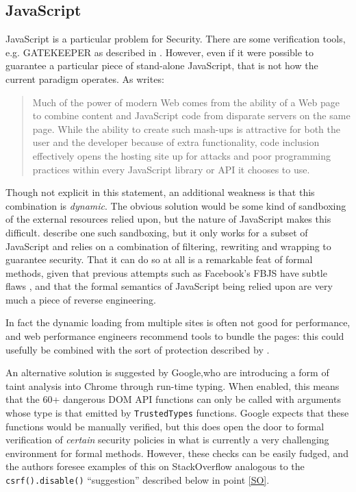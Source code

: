 \documentclass{llncs}
\begin{document}
\subsection{JavaScript}
JavaScript is a particular problem for Security. There are some verification tools, e.g. GATEKEEPER as described in \cite{GuarnieriLivshits2009}. However, even if it were possible to guarantee a particular piece of stand-alone JavaScript, that is not how the current paradigm operates. As \cite{MeyerovichLivshits2010a} writes:
\begin{quote}
Much of the power of modern Web comes from the
ability of a Web page to combine content and JavaScript code
from disparate servers on the same page. While the ability
to create such mash-ups is attractive for both the user and
the developer because of extra functionality, code inclusion
effectively opens the hosting site up for attacks and poor
programming practices within every JavaScript library or API
it chooses to use.
\end{quote}
Though not explicit in this statement, an additional weakness is that this combination is \emph{dynamic}.
The obvious solution would be some kind of sandboxing of the external resources relied upon, but the nature of JavaScript makes this difficult.  \cite{Maffeisetal2009} describe one such sandboxing, but it only works for a subset of JavaScript and relies on a combination of filtering, rewriting and wrapping to guarantee security. That it can do so at all is a remarkable feat of formal methods, given that previous attempts such as Facebook's FBJS have subtle flaws \cite{MaffeisTaly2009}, and that the formal semantics of JavaScript being relied upon are very much a piece of reverse engineering.
\par
In fact the dynamic loading from multiple sites is often not good for performance, and web performance engineers recommend tools to bundle the pages: this could usefully be combined with the sort of protection described by \cite{Maffeisetal2009}.
\par
An alternative solution is suggested by Google,who are introducing a form of taint analysis into Chrome \cite{Kotowicz2019a} through run-time typing. When enabled, this means that the 60+ dangerous DOM API functions can only be called with arguments whose type is that emitted by \verb+TrustedTypes+ functions. Google expects that these functions would be manually verified, but this does open the door to formal verification of \emph{certain} security policies in what is currently a very challenging environment for formal methods. However, these checks can be easily fudged, and the authors foresee examples of this on StackOverflow analogous to the \verb!csrf().disable()! ``suggestion'' described below in point \ref{SO}.
\end{document}
